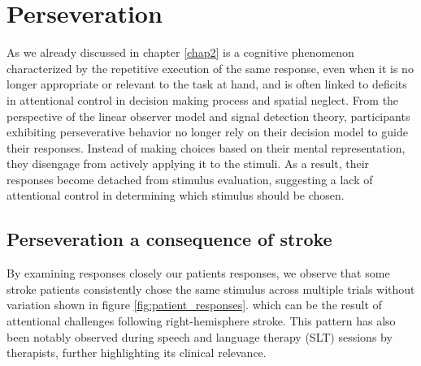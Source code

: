 \section {Perseveration} 
As we already discussed in chapter \ref{chap2} is a cognitive phenomenon characterized by the repetitive execution of the same response, even when it is no longer appropriate or relevant to the task at hand, and is often linked to deficits in attentional control in decision making process and spatial neglect. From the perspective of the linear observer model and signal detection theory, participants exhibiting perseverative behavior no longer rely on their decision model to guide their responses. Instead of making choices based on their mental representation, they disengage from actively applying it to the stimuli. As a result, their responses become detached from stimulus evaluation, suggesting a lack of attentional control in determining which stimulus should be chosen.

\subsection {Perseveration a consequence of stroke} 

By examining responses closely our patients responses, we observe that some stroke patients consistently chose the same stimulus across multiple trials without variation shown in figure \ref{fig:patient_responses}. which can be the result of attentional challenges following right-hemisphere stroke. This pattern has also been notably observed during speech and language therapy (SLT) sessions by therapists, further highlighting its clinical relevance. 

